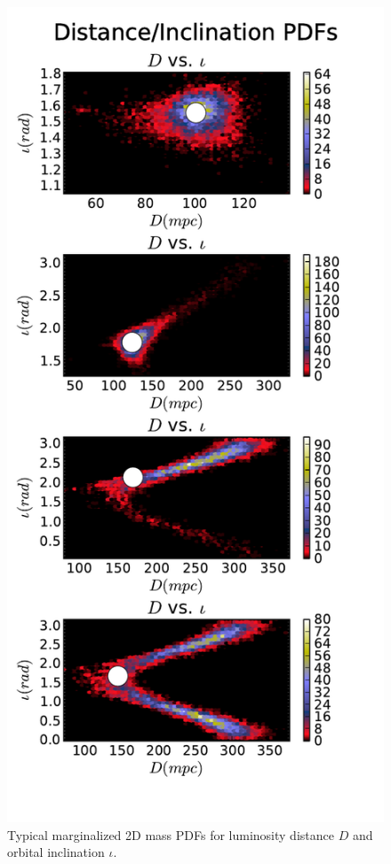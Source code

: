 \documentclass[11pt,a4paper]{emulateapj}
\begin{document}
   
\begin{figure}[h!]
  \centering
 \includegraphics[trim=0cm 0cm 0cm 0cm, clip=true,scale=0.8]{distIota2D.pdf}
 \caption{Typical marginalized 2D mass PDFs for luminosity distance $D$ and orbital inclination $\iota$. }
 \label{distIotaPDF}
\end{figure}
\end{document}
